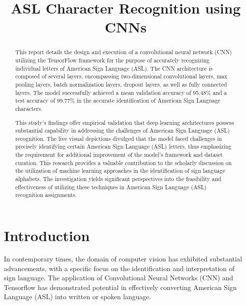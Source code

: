 \documentclass[conference]{IEEEtran}
\begin{document}
\title{ASL Character Recognition using CNNs
}

\author{
}

\maketitle
\begin{abstract}
This report details the design and execution of a convolutional neural network (CNN) utilizing the TensorFlow framework for the purpose of accurately recognizing individual letters of American Sign Language (ASL). The CNN architecture is composed of several layers, encompassing two-dimensional convolutional layers, max pooling layers, batch normalization layers, dropout layers, as well as fully connected layers. The model successfully achieved a mean validation accuracy of 95.48\% and a test accuracy of 99.77\% in the accurate identification of American Sign Language characters.

This study's findings offer empirical validation that deep learning architectures possess substantial capability in addressing the challenges of American Sign Language (ASL) recognition. The live visual depictions divulged that the model faced challenges in precisely identifying certain American Sign Language (ASL) letters, thus emphasizing the requirement for additional improvement of the model's framework and dataset curation. This research provides a valuable contribution to the scholarly discussion on the utilization of machine learning approaches in the identification of sign language alphabets. The investigation yields significant perspectives into the feasibility and effectiveness of utilizing these techniques in American Sign Language (ASL) recognition assignments.
\end{abstract}


\section{Introduction}
In contemporary times, the domain of computer vision has exhibited substantial advancements, with a specific focus on the identification and interpretation of sign language. The application of Convolutional Neural Networks (CNN) and Tensorflow has demonstrated potential in effectively converting American Sign Language (ASL) into written or spoken language.
\end{document}
